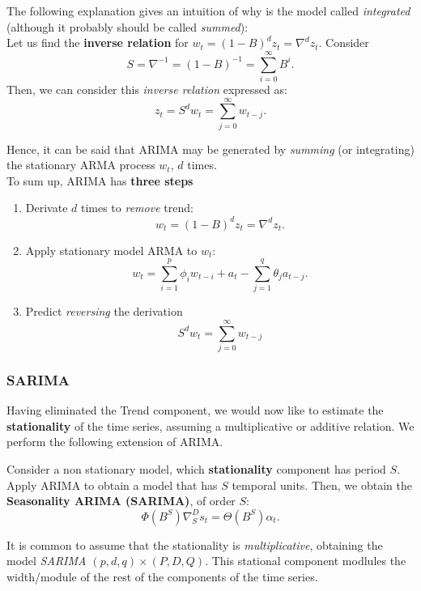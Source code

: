 The following explanation gives an intuition of why is the model called \emph{integrated} (although it probably should be called \emph{summed}):\\

Let us find the \textbf{inverse relation} for \(w_{t} = (1-B)^{d}z_{t} = \nabla^d z_{t}\). Consider
\[
S = \nabla^{-1} = (1-B)^{-1} = \sum_{i = 0}^{\infty}B^{i}.
\]
Then, we can consider this \emph{inverse relation} expressed as:
\[
z_{t} = S^{d}w_{t} = \sum_{j = 0}^{\infty}w_{t-j}.
\]

Hence, it can be said that ARIMA may be generated by \emph{summing} (or integrating) the stationary ARMA process \(w_{t}\), \(d\) times.\\

To sum up, ARIMA has \textbf{three steps}

\begin{enumerate}
  \item Derivate \(d\) times to \emph{remove} trend:
        \[
        w_{t} = (1-B)^{d} z_{t} = \nabla^{d}z_{t}.
        \]
  \item Apply stationary model ARMA to \(w_{t}\):
        \[
  w_{t} = \sum_{i = 1}^{p} \phi_{i}w_{t-i} + a_{t} - \sum_{j = 1}^{q} \theta_{j}a_{t-j}.
        \]
  \item Predict \emph{reversing} the derivation
        \[
 S^{d}w_{t} = \sum_{j = 0}^{\infty}w_{t-j}
        \]

\end{enumerate}

\subsubsection{SARIMA}

Having eliminated the Trend component, we would now like to estimate the \textbf{stationality} of the time series, assuming a multiplicative or additive relation. We perform the following extension of ARIMA.

\begin{ndef}
  Consider a non stationary model, which \textbf{stationality} component has period \(S\). Apply ARIMA to obtain a model that has \(S\) temporal units. Then, we obtain the \textbf{Seasonality ARIMA (SARIMA)}, of order \(S\):
  \[
    \Phi(B^{S})\nabla_{S}^{D}s_{t} = \Theta (B^{S}) \alpha_{t}.
  \]
\end{ndef}

It is common to assume that the stationality is \emph{multiplicative}, obtaining the model \emph{SARIMA \((p,d,q)\times (P,D,Q)\)}. This stational component modlules the width/module of the rest of the components of the time series.


